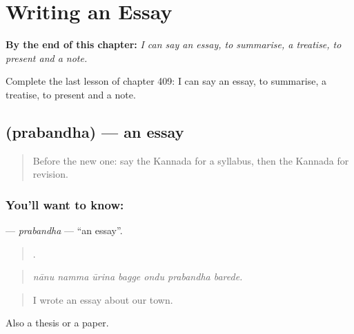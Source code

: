 
\chapter{Writing an Essay}
\label{ch:ka-writing-an-essay}

\begin{chapteropening}
\textbf{By the end of this chapter:} \emph{I can say an essay, to summarise, a treatise, to present and a note.}

Complete the last lesson of chapter 409: I can say an essay, to summarise, a treatise, to present and a note.
\end{chapteropening}

\section[\texorpdfstring{\kn{ಪ್ರಬಂಧ} (prabandha)}{ಪ್ರಬಂಧ (prabandha)}]{ (prabandha) — an essay}

\label{lesson:KA-C409-prabandha}



\begin{quote}
Before the new one: say the Kannada for a syllabus, then the Kannada for revision.
\end{quote}

\subsection*{You'll want to know: }
\textbf{} — \emph{prabandha} — \textquotedblleft{}an essay\textquotedblright{}.

\begin{quote}
      .
\end{quote}

\begin{quote}
\emph{nānu namma ūrina bagge ondu prabandha barede.}
\end{quote}

\begin{quote}
I wrote an essay about our town.
\end{quote}

Also a thesis or a paper.

